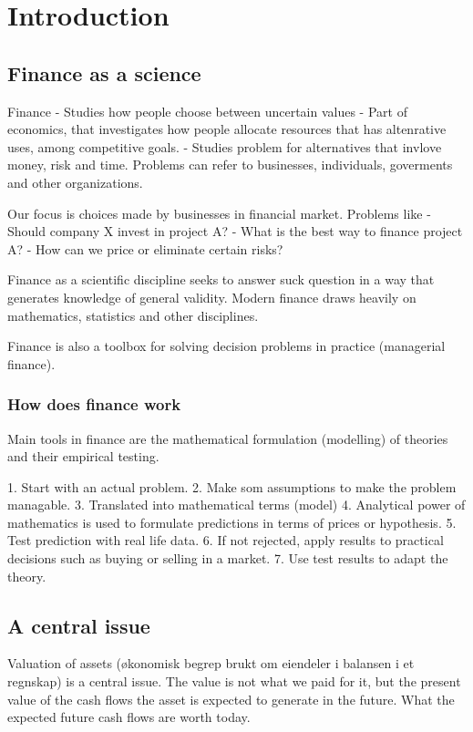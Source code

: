 \section{Introduction}
\subsection{Finance as a science}
Finance
- Studies how people choose between uncertain values
- Part of economics, that investigates how people allocate resources that has altenrative uses, among competitive goals.
- Studies problem for alternatives that invlove money, risk and time. Problems can refer to businesses, individuals, goverments and other organizations.

Our focus is choices made by businesses in financial market. Problems like
- Should company X invest in project A?
- What is the best way to finance project A?
- How can we price or eliminate certain risks?

Finance as a scientific discipline seeks to answer suck question in a way that generates knowledge of general validity. Modern finance draws heavily on mathematics, statistics and other disciplines. 

Finance is also a toolbox for solving decision problems in practice (managerial finance).

\subsubsection{How does finance work}
Main tools in finance are the mathematical formulation (modelling) of theories and their empirical testing.

1. Start with an actual problem.
2. Make som assumptions to make the problem managable.
3. Translated into mathematical terms (model)
4. Analytical power of mathematics is used to formulate predictions in terms of prices or hypothesis.
5. Test prediction with real life data.
6. If not rejected, apply results to practical decisions such as buying or selling in a market.
7. Use test results to adapt the theory.

\subsection{A central issue}
Valuation of assets (økonomisk begrep brukt om eiendeler i balansen i et regnskap) is a central issue. The value is not what we paid for it, but the present value of the cash flows the asset is expected to generate in the future. What the expected future cash flows are worth today.

